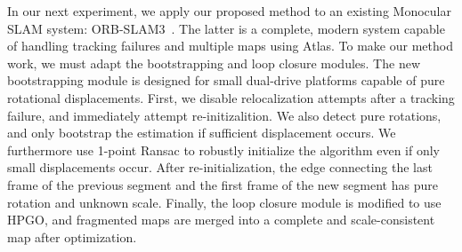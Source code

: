 \documentclass[letterpaper, 10 pt, conference]{ieeeconf}  %
\begin{document}
In our next experiment, we apply our proposed method to an existing Monocular SLAM system: ORB-SLAM3~\cite{campos2021orb}. The latter is a complete, modern system capable of handling tracking failures and multiple maps using Atlas\cite{elvira2019orbslam}.
To make our method work, we must adapt the bootstrapping and loop closure modules. The new bootstrapping module is designed for small dual-drive platforms capable of pure rotational displacements. First, we disable relocalization attempts after a tracking failure, and immediately attempt re-initizalition. We also detect pure rotations, and only bootstrap the estimation if sufficient displacement occurs. We furthermore use 1-point Ransac \cite{scaramuzza20111} to robustly initialize the algorithm even if only small displacements occur. After re-initialization, the edge connecting the last frame of the previous segment and the first frame of the new segment has pure rotation and unknown scale. Finally, the loop closure module is modified to use HPGO, and fragmented maps are merged into a complete and scale-consistent map after optimization.
\end{document}
